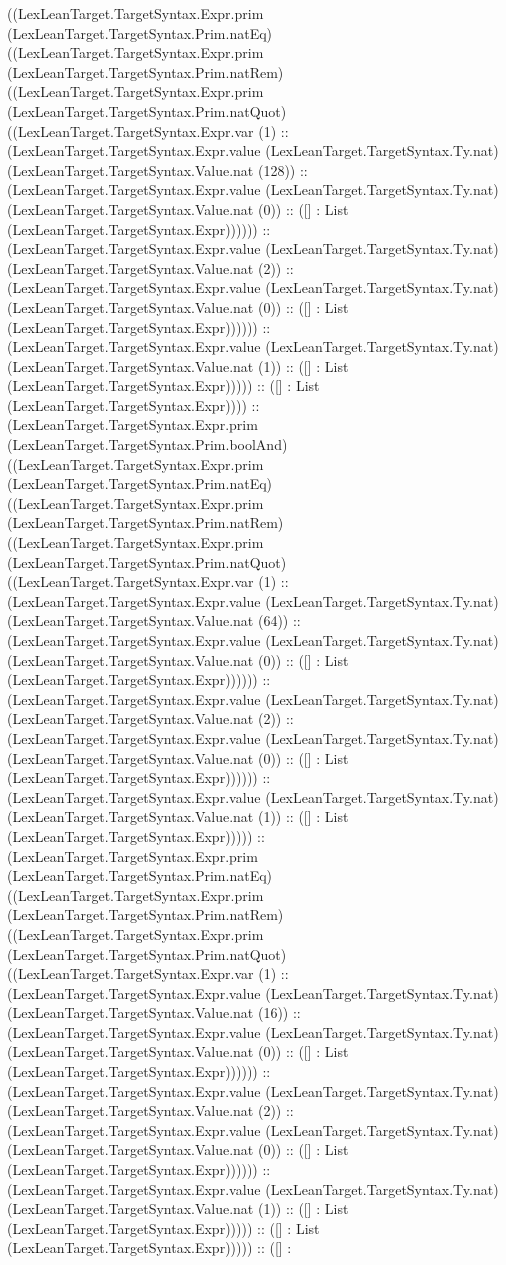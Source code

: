 \documentclass[11pt]{article}
\begin{document}
((LexLeanTarget.TargetSyntax.Expr.prim (LexLeanTarget.TargetSyntax.Prim.natEq) ((LexLeanTarget.TargetSyntax.Expr.prim (LexLeanTarget.TargetSyntax.Prim.natRem) ((LexLeanTarget.TargetSyntax.Expr.prim (LexLeanTarget.TargetSyntax.Prim.natQuot) ((LexLeanTarget.TargetSyntax.Expr.var (1) :: (LexLeanTarget.TargetSyntax.Expr.value (LexLeanTarget.TargetSyntax.Ty.nat) (LexLeanTarget.TargetSyntax.Value.nat (128)) :: (LexLeanTarget.TargetSyntax.Expr.value (LexLeanTarget.TargetSyntax.Ty.nat) (LexLeanTarget.TargetSyntax.Value.nat (0)) :: ([] : List (LexLeanTarget.TargetSyntax.Expr)))))) :: (LexLeanTarget.TargetSyntax.Expr.value (LexLeanTarget.TargetSyntax.Ty.nat) (LexLeanTarget.TargetSyntax.Value.nat (2)) :: (LexLeanTarget.TargetSyntax.Expr.value (LexLeanTarget.TargetSyntax.Ty.nat) (LexLeanTarget.TargetSyntax.Value.nat (0)) :: ([] : List (LexLeanTarget.TargetSyntax.Expr)))))) :: (LexLeanTarget.TargetSyntax.Expr.value (LexLeanTarget.TargetSyntax.Ty.nat) (LexLeanTarget.TargetSyntax.Value.nat (1)) :: ([] : List (LexLeanTarget.TargetSyntax.Expr))))) :: ([] : List (LexLeanTarget.TargetSyntax.Expr)))) :: (LexLeanTarget.TargetSyntax.Expr.prim (LexLeanTarget.TargetSyntax.Prim.boolAnd) ((LexLeanTarget.TargetSyntax.Expr.prim (LexLeanTarget.TargetSyntax.Prim.natEq) ((LexLeanTarget.TargetSyntax.Expr.prim (LexLeanTarget.TargetSyntax.Prim.natRem) ((LexLeanTarget.TargetSyntax.Expr.prim (LexLeanTarget.TargetSyntax.Prim.natQuot) ((LexLeanTarget.TargetSyntax.Expr.var (1) :: (LexLeanTarget.TargetSyntax.Expr.value (LexLeanTarget.TargetSyntax.Ty.nat) (LexLeanTarget.TargetSyntax.Value.nat (64)) :: (LexLeanTarget.TargetSyntax.Expr.value (LexLeanTarget.TargetSyntax.Ty.nat) (LexLeanTarget.TargetSyntax.Value.nat (0)) :: ([] : List (LexLeanTarget.TargetSyntax.Expr)))))) :: (LexLeanTarget.TargetSyntax.Expr.value (LexLeanTarget.TargetSyntax.Ty.nat) (LexLeanTarget.TargetSyntax.Value.nat (2)) :: (LexLeanTarget.TargetSyntax.Expr.value (LexLeanTarget.TargetSyntax.Ty.nat) (LexLeanTarget.TargetSyntax.Value.nat (0)) :: ([] : List (LexLeanTarget.TargetSyntax.Expr)))))) :: (LexLeanTarget.TargetSyntax.Expr.value (LexLeanTarget.TargetSyntax.Ty.nat) (LexLeanTarget.TargetSyntax.Value.nat (1)) :: ([] : List (LexLeanTarget.TargetSyntax.Expr))))) :: (LexLeanTarget.TargetSyntax.Expr.prim (LexLeanTarget.TargetSyntax.Prim.natEq) ((LexLeanTarget.TargetSyntax.Expr.prim (LexLeanTarget.TargetSyntax.Prim.natRem) ((LexLeanTarget.TargetSyntax.Expr.prim (LexLeanTarget.TargetSyntax.Prim.natQuot) ((LexLeanTarget.TargetSyntax.Expr.var (1) :: (LexLeanTarget.TargetSyntax.Expr.value (LexLeanTarget.TargetSyntax.Ty.nat) (LexLeanTarget.TargetSyntax.Value.nat (16)) :: (LexLeanTarget.TargetSyntax.Expr.value (LexLeanTarget.TargetSyntax.Ty.nat) (LexLeanTarget.TargetSyntax.Value.nat (0)) :: ([] : List (LexLeanTarget.TargetSyntax.Expr)))))) :: (LexLeanTarget.TargetSyntax.Expr.value (LexLeanTarget.TargetSyntax.Ty.nat) (LexLeanTarget.TargetSyntax.Value.nat (2)) :: (LexLeanTarget.TargetSyntax.Expr.value (LexLeanTarget.TargetSyntax.Ty.nat) (LexLeanTarget.TargetSyntax.Value.nat (0)) :: ([] : List (LexLeanTarget.TargetSyntax.Expr)))))) :: (LexLeanTarget.TargetSyntax.Expr.value (LexLeanTarget.TargetSyntax.Ty.nat) (LexLeanTarget.TargetSyntax.Value.nat (1)) :: ([] : List (LexLeanTarget.TargetSyntax.Expr))))) :: ([] : List (LexLeanTarget.TargetSyntax.Expr))))) :: ([] : 
\end{document}
